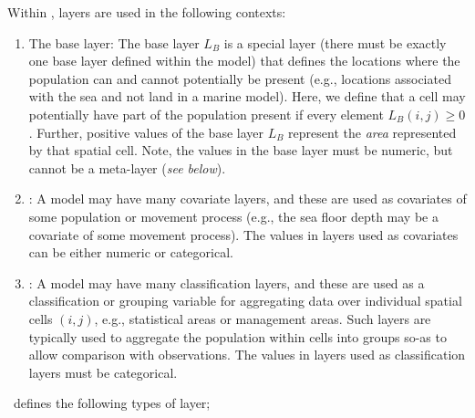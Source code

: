 Within \SPM, layers are used in the following contexts:
\begin{enumerate}
\item The base layer: The base layer $L_B$ is a special layer (there must be exactly one base layer defined within the model) that defines the locations where the population can and cannot potentially be present (e.g., locations associated with the sea and not land in a marine model). Here, we define that a cell may potentially have part of the population present if every element $L_B(i,j) \ge 0$. Further, positive values of the base layer $L_B$ represent the \emph{area} represented by that spatial cell. Note, the values in the base layer must be numeric, but cannot be a meta-layer (\emph{see below}).
\item {}: A model may have many covariate layers, and these are used as covariates of some population or movement process (e.g., the sea floor depth may be a covariate of some movement process). The values in layers used as covariates can be either numeric or categorical.
\item {}: A model may have many classification layers, and these are used as a classification or grouping variable for aggregating data over individual spatial cells $(i,j)$, e.g., statistical areas or management areas. Such layers are typically used to aggregate the population within cells into groups so-as to allow comparison with observations. The values in layers used as classification layers must be categorical.
\end{enumerate}

\SPM\ defines the following types of layer;

